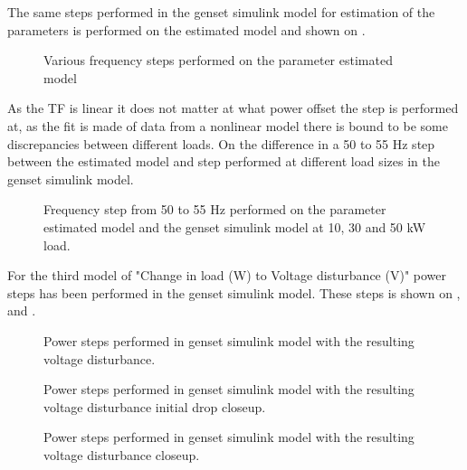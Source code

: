 The same steps performed in the genset simulink model for estimation of the parameters is performed on the estimated model and shown on . 

\begin{figure}[H]
\centering

\caption{Various frequency steps performed on the parameter estimated model}
\label{fig:freqtopowermodelsteps}
\end{figure}

As the TF is linear it does not matter at what power offset the step is performed at, as the fit is made of data from a nonlinear model there is bound to be some discrepancies between different loads. On  the difference in a 50 to 55 Hz step between the estimated model and step performed at different load sizes in the genset simulink model.

\begin{figure}[H]
\centering

\caption{Frequency step from 50 to 55 Hz performed on the parameter estimated model and the genset simulink model at 10, 30 and 50 kW load.}
\label{fig:freq5055step103050model}
\end{figure}

For the third model of "Change in load (W) to Voltage disturbance (V)" power steps has been performed in the genset simulink model. These steps is shown on ,  and . 

\begin{figure}[H]
\centering

\caption{Power steps performed in genset simulink model with the resulting voltage disturbance.}
\label{fig:powerstepsvoltdisturbance1}
\end{figure}

\begin{figure}[H]
\centering

\caption{Power steps performed in genset simulink model with the resulting voltage disturbance initial drop closeup.}
\label{fig:powerstepsvoltdisturbance3}
\end{figure}

\begin{figure}[H]
\centering

\caption{Power steps performed in genset simulink model with the resulting voltage disturbance closeup.}
\label{fig:powerstepsvoltdisturbance2}
\end{figure}

